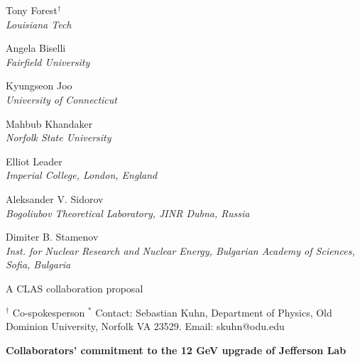 \documentclass[12pt]{article}
\begin{document}
\begin{titlepage}
{\center Tony Forest$^{\dagger}$ \\}
\vspace{-8pt}
{\center \small \it Louisiana Tech \\}

{\center Angela Biselli \\}
\vspace{-8pt}
{\center \small \it Fairfield University \\}

{\center Kyungseon Joo \\}
\vspace{-8pt}
{\center \small \it University of Connecticut \\}

{\center Mahbub Khandaker \\}
\vspace{-8pt}
{\center \small \it Norfolk State University \\}

{\center Elliot Leader \\}
\vspace{-8pt}
{\center \small \it Imperial College, London, England \\}

{\center Aleksander V. Sidorov \\}
\vspace{-8pt}
{\center \small \it Bogoliubov Theoretical Laboratory, JINR Dubna, Russia \\}

{\center Dimiter B. Stamenov \\}
\vspace{-8pt}
{\center \small \it Inst. for Nuclear Research and Nuclear Energy,
Bulgarian Academy of Sciences, Sofia, Bulgaria \\}

{\center \large A CLAS collaboration proposal\\}



\vspace*{12 pt}
{\small $^{\dagger}$ Co-spokesperson}
{\small $^*$ Contact: Sebastian Kuhn, Department of Physics, Old Dominion University,
Norfolk VA 23529. Email: skuhn@odu.edu}

\end{titlepage}
\newpage
\pagebreak
\clearpage

{\center \large \bf  Collaborators' commitment to the 12 GeV upgrade of Jefferson Lab}
\end{document}
